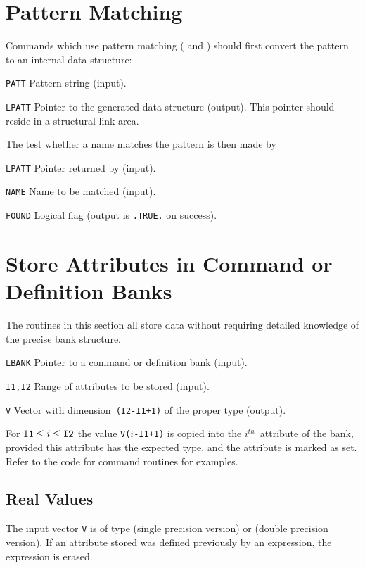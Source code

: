\section{Pattern Matching}
\label{UTPATT}
Commands which use pattern matching ( and
) should first convert the pattern to an internal data
structure: 
\begin{mylist}
\item[\tt PATT]
Pattern string (input).
\item[\tt LPATT]
Pointer to the generated data structure (output).
This pointer should reside in a structural link area.
\end{mylist}
The test whether a name matches the pattern is then made by
\begin{mylist}
\item[\tt LPATT]
Pointer returned by  (input).
\item[\tt NAME]
Name to be matched (input).
\item[\tt FOUND]
Logical flag (output is {\tt .TRUE.} on success).
\end{mylist}

\section{Store Attributes in Command or Definition Banks}
The routines in this section all store data without
requiring detailed knowledge of the precise bank structure.
\begin{mylist}
\item[\tt LBANK]
Pointer to a command or definition bank (input).
\item[\tt I1,I2]
Range of attributes to be stored (input).
\item[\tt V]
Vector with dimension~{\tt (I2-I1+1)} of the proper type (output).
\end{mylist}
For ${\tt I1} \le i \le {\tt I2}$ the value {\tt V($i$-I1+1)} is
copied into the $i^{th}$~attribute of the bank, provided this
attribute has the expected type, 
and the attribute is marked as set.
Refer to the code for command routines for examples.

\subsection{Real Values}
\label{UTPFLT}
The input vector {\tt V} is of type  (single precision
version) or  (double precision version).
If an attribute stored was defined previously by an expression,
the expression is erased.

